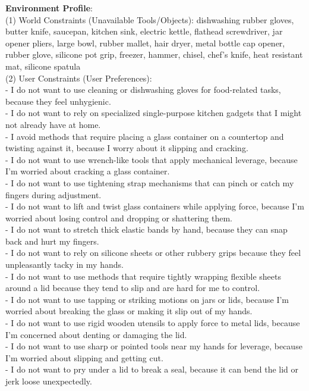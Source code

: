 \documentclass{llmxive}
\begin{document}
\begin{tcolorbox}
\textbf{Environment Profile}:\\
(1) World Constraints (Unavailable Tools/Objects): dishwashing rubber gloves, butter knife, saucepan, kitchen sink, electric kettle, flathead screwdriver, jar opener pliers, large bowl, rubber mallet, hair dryer, metal bottle cap opener, rubber glove, silicone pot grip, freezer, hammer, chisel, chef's knife, heat resistant mat, silicone spatula\\
(2) User Constraints (User Preferences):\\
- I do not want to use cleaning or dishwashing gloves for food-related tasks, because they feel unhygienic.\\
- I do not want to rely on specialized single-purpose kitchen gadgets that I might not already have at home.\\
- I avoid methods that require placing a glass container on a countertop and twisting against it, because I worry about it slipping and cracking.\\
- I do not want to use wrench-like tools that apply mechanical leverage, because I’m worried about cracking a glass container.\\
- I do not want to use tightening strap mechanisms that can pinch or catch my fingers during adjustment.\\
- I do not want to lift and twist glass containers while applying force, because I’m worried about losing control and dropping or shattering them.\\
- I do not want to stretch thick elastic bands by hand, because they can snap back and hurt my fingers.\\
- I do not want to rely on silicone sheets or other rubbery grips because they feel unpleasantly tacky in my hands.\\
- I do not want to use methods that require tightly wrapping flexible sheets around a lid because they tend to slip and are hard for me to control.\\
- I do not want to use tapping or striking motions on jars or lids, because I’m worried about breaking the glass or making it slip out of my hands.\\
- I do not want to use rigid wooden utensils to apply force to metal lids, because I’m concerned about denting or damaging the lid.\\
- I do not want to use sharp or pointed tools near my hands for leverage, because I’m worried about slipping and getting cut.\\
- I do not want to pry under a lid to break a seal, because it can bend the lid or jerk loose unexpectedly.\\

\end{tcolorbox}
\end{document}
